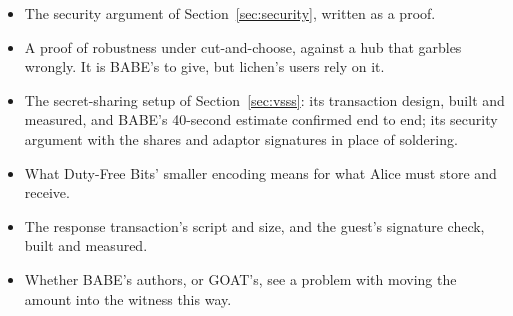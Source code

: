 \documentclass[11pt]{article}
\begin{document}
\begin{itemize}[leftmargin=1.5em]
\item The security argument of Section~\ref{sec:security}, written as a
  proof.
\item A proof of robustness under cut-and-choose, against a hub that
  garbles wrongly. It is BABE's to give, but lichen's users rely on it.
\item The secret-sharing setup of Section~\ref{sec:vsss}: its
  transaction design, built and measured, and BABE's 40-second estimate
  confirmed end to end; its security argument with the shares and
  adaptor signatures in place of soldering.
\item What Duty-Free Bits' smaller encoding means for what Alice must
  store and receive.
\item The response transaction's script and size, and the guest's
  signature check, built and measured.
\item Whether BABE's authors, or GOAT's, see a problem with moving the
  amount into the witness this way.
\end{itemize}
\end{document}
